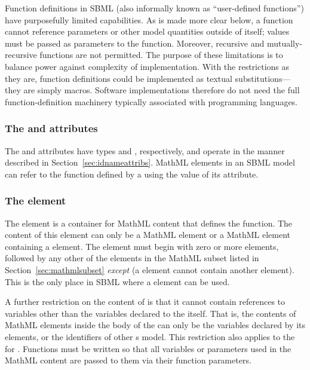 Function definitions in SBML (also informally known as
``user-defined functions'') have purposefully limited capabilities.
As is made more clear below, a function cannot reference
parameters or other model quantities outside of itself; values
must be passed as parameters to the function.  Moreover, recursive
and mutually-recursive functions are not permitted.  The purpose
of these limitations is to balance power against complexity of
implementation.  With the restrictions as they are, function
definitions could be implemented as textual substitutions---they
are simply macros.  Software implementations therefore do not need
the full function-definition machinery typically associated with
programming languages.


\subsubsection{The  and  attributes}

The  and  attributes have types 
and , respectively, and operate in the manner
described in Section~\ref{sec:idnameattribs}.  MathML 
elements in an SBML model can refer to the function defined by a
\FunctionDefinition using the value of its  attribute.


\subsubsection{The  element}
\label{sec:function-definition-math}

\begin{blockChanged}

The  element is a container for MathML
content that defines the function.  The content of this
element can only be a MathML  element
or a MathML  element containing a
   element.  The  element must begin
with zero or more  elements, followed by any other of
the elements in the MathML subset listed in
Section~\ref{sec:mathmlsubset} \emph{except}  (\ie a
 element cannot contain another 
element).  This is the only place in SBML where a 
element can be used.

\end{blockChanged}

A further restriction on the content of  is that it
cannot contain references to variables other than the variables
declared to the  itself.  That is, the contents of
MathML  elements inside the body of the 
can only be the variables declared by its  elements,
or the identifiers of other \FunctionDefinition{}s  model.  This restriction also applies to the
   for .  Functions must be written
so that all variables or parameters used in the MathML content are
passed to them via their function parameters.


